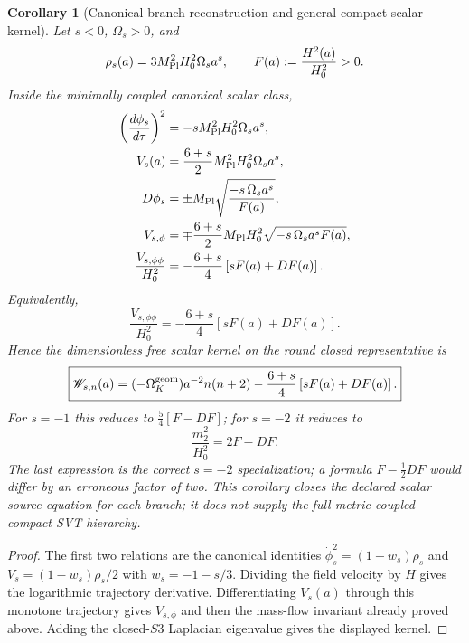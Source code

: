 \documentclass[11pt,a4paper]{article}
\def\Sthree{S3}%
\def\dd{d}%
\def\Dil{D}%
\numberwithin{equation}{section}
\theoremstyle{definition}
\theoremstyle{plain}
\newtheorem{corollary}[criterion]{Corollary}
\theoremstyle{remark}
\newcommand{\Sthree}{S^3}
\newcommand{\Dil}{\mathscr{D}}
\newcommand{\dd}{\mathrm{d}}
\begin{document}
\begin{corollary}[Canonical branch reconstruction and general compact scalar kernel]
\label{cor:general-canonical-branch-kernel}
Let \(s<0\), \(\Omega_s>0\), and
\begin{equation}
\rho_s(a)=3M_{\rm Pl}^2H_0^2\Omega_s a^s,
\qquad
F(a):=\frac{H^2(a)}{H_0^2}>0.
\end{equation}
Inside the minimally coupled canonical scalar class,
\begin{align}
\left(\frac{\dd\phi_s}{\dd\tau}\right)^2
&=-sM_{\rm Pl}^2H_0^2\Omega_s a^s,\\
V_s(a)&=\frac{6+s}{2}M_{\rm Pl}^2H_0^2\Omega_s a^s,\\
\Dil\phi_s
&=\pm M_{\rm Pl}\sqrt{\frac{-s\,\Omega_s a^s}{F(a)}},\\
V_{s,\phi}
&=\mp\frac{6+s}{2}M_{\rm Pl}H_0^2
\sqrt{-s\,\Omega_s a^sF(a)},\\
\frac{V_{s,\phi\phi}}{H_0^2}
&=-\frac{6+s}{4}\left[sF(a)+\Dil F(a)\right].
\end{align}
Equivalently,
\begin{equation}
\boxed{
\frac{V_{s,\phi\phi}}{H_0^2}
=-\frac{6+s}{4}\left[sF(a)+\Dil F(a)\right].}
\end{equation}
Hence the dimensionless free scalar kernel on the round closed representative is
\begin{equation}
\boxed{
\mathscr W_{s,n}(a)=
(-\Omega_K^{\rm geom})a^{-2}n(n+2)
-\frac{6+s}{4}\left[sF(a)+\Dil F(a)\right].}
\end{equation}
For \(s=-1\) this reduces to
\(\frac54[F-\Dil F]\); for \(s=-2\) it reduces to
\begin{equation}
\boxed{
\frac{m_2^2}{H_0^2}=2F-\Dil F.}
\end{equation}
The last expression is the correct \(s=-2\) specialization; a formula
\(F-\tfrac12\Dil F\) would differ by an erroneous factor of two.
This corollary closes the declared scalar source equation for each branch; it
does not supply the full metric-coupled compact SVT hierarchy.
\end{corollary}

\begin{proof}
The first two relations are the canonical identities
\(\dot\phi_s^2=(1+w_s)\rho_s\) and
\(V_s=(1-w_s)\rho_s/2\) with \(w_s=-1-s/3\).  Dividing the field velocity by
\(H\) gives the logarithmic trajectory derivative.  Differentiating \(V_s(a)\)
through this monotone trajectory gives \(V_{s,\phi}\) and then the mass-flow
invariant already proved above.  Adding the closed-\(\Sthree\) Laplacian
eigenvalue gives the displayed kernel.
\end{proof}
\end{document}

